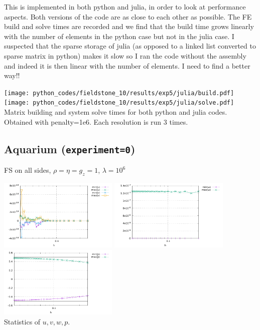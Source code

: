 This \stone is implemented in both python and julia, in order to look at
performance aspects. Both versions of the code are as close to each other 
as possible. The FE build and solve times are recorded and we find
that the build time grows linearly with the number of elements in the python 
case but not in the julia case. I suspected that the sparse storage of julia
(as opposed to a linked list converted to sparse matrix in python) makes it slow
so I ran the code without the assembly and indeed it is then linear with the 
number of elements.
I need to find a better way!!

\begin{center}
\texttt{[image: python\_codes/fieldstone\_10/results/exp5/julia/build.pdf]}
\texttt{[image: python\_codes/fieldstone\_10/results/exp5/julia/solve.pdf]}\\
{\captionfont Matrix building and system solve times for both python and julia codes.
Obtained with penalty=1e6. Each resolution is run 3 times.}
\end{center}


\subsection*{Aquarium ({\tt experiment=0})}

FS on all sides, $\rho=\eta=g_z=1$, $\lambda=10^6$

\begin{center}
\includegraphics[width=5.7cm]{python_codes/fieldstone_10/results/exp0/stats_uv}
\includegraphics[width=5.7cm]{python_codes/fieldstone_10/results/exp0/stats_w}
\includegraphics[width=5.7cm]{python_codes/fieldstone_10/results/exp0/stats_p}\\
{\captionfont Statistics of $u,v,w,p$.}
\end{center}

